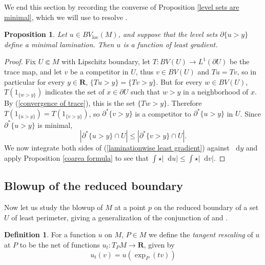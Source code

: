\documentclass[reqno,12pt,letterpaper]{amsart}
\newcommand{\RR}{\mathbf{R}}
\newcommand*\dif{\mathop{}\!\mathrm{d}}
\newcommand{\dfn}[1]{\emph{#1}\index{#1}}
\newcommand{\loc}{\mathrm{loc}}
\newtheorem{proposition}[theorem]{Proposition}
\theoremstyle{definition}
\newtheorem{definition}[theorem]{Definition}
\numberwithin{equation}{section}
\begin{document}
We end this section by recording the converse of Proposition \ref{level sets are minimal}, which we will use to resolve \cite[Problem 9.7]{daskalopoulos2020transverse}.

\begin{proposition}\label{minimal bounding implies least gradient}
Let $u \in BV_\loc(M)$, and suppose that the level sets $\partial \{u > y\}$ define a minimal lamination.
Then $u$ is a function of least gradient.
\end{proposition}
\begin{proof}
Fix $U \Subset M$ with Lipschitz boundary, let $T: BV(U) \to L^1(\partial U)$ be the trace map, and let $v$ be a competitor in $U$, thus $v \in BV(U)$ and $Tu = Tv$, so in particular for every $y \in \RR$, $\{Tu > y\} = \{Tv > y\}$.
But for every $w \in BV(U)$, $T(1_{\{w > y\}})$ indicates the set of $x \in \partial U$ such that $w > y$ in a neighborhood of $x$.
By (\ref{convergence of trace}), this is the set $\{Tw > y\}$.
Therefore $T(1_{\{u > y\}}) = T(1_{\{v > y\}})$, so $\partial^* \{v > y\}$ is a competitor to $\partial^* \{u > y\}$ in $U$.
Since $\partial^* \{u > y\}$ is minimal,
\begin{equation}\label{laminationwise least gradient}
|\partial^* \{u > y\} \cap U| \leq |\partial^* \{v > y\} \cap U|.
\end{equation}
We now integrate both sides of (\ref{laminationwise least gradient}) against $\dif y$ and apply Proposition \ref{coarea formula} to see that $\int \star |\dif u| \leq \int \star |\dif v|$.
\end{proof}


\subsection{Blowup of the reduced boundary}
Now let us study the blowup of $M$ at a point $p$ on the reduced boundary of a set $U$ of least perimeter, giving a generalization of the conjunction of \cite[Theorem 9.3]{Giusti77} and \cite[Theorem 6.2.2]{Simons68}.

\begin{definition}
For a function $u$ on $M$, $P \in M$ we define the \dfn{tangent rescaling} of $u$ at $P$ to be the net of functions $u_t: T_PM \to \RR$, given by
$$u_t(v) = u\left(\exp_P(tv)\right)$$
\end{definition}
\end{document}
